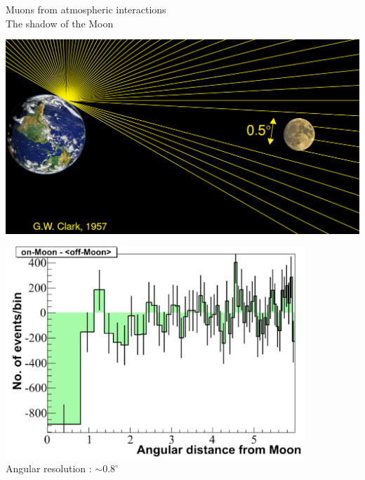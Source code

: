 \Tr
\onecolumn
\begin{center}
{\red Muons from atmospheric interactions}\\[1cm]
{\blue The shadow of the Moon}\\[5mm]
\includegraphics[keepaspectratio,height=8cm]{moon-shadow1}
\includegraphics[keepaspectratio,height=8cm]{moon-shadow2}\\[1cm]
{\blue Angular resolution : $\sim 0.8^{\circ}$}
\end{center}

